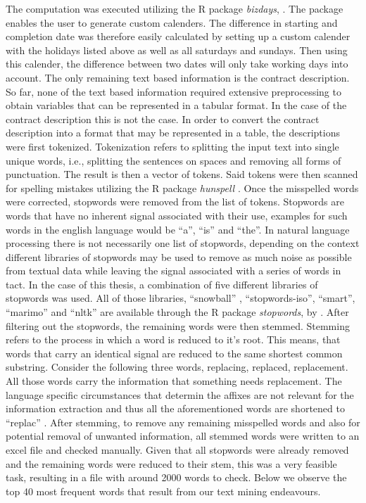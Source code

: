 \documentclass[a4paper,12pt, headsepline]{scrartcl}
\numberwithin{equation}{section}
\begin{document}
 The computation was executed utilizing the R package \textit{bizdays}, \citet{bizdays}. The package enables the user to generate custom calenders. The difference in starting and completion date was therefore easily calculated by setting up a custom calender with the holidays listed above as well as all saturdays and sundays. Then using this calender, the difference between two dates will only take working days into account.
 The only remaining text based information is the contract description. So far, none of the text based information required extensive preprocessing to obtain variables that can be represented in a tabular format. In the case of the contract description this is not the case. In order to convert the contract description into a format that may be represented in a table, the descriptions were first tokenized. Tokenization refers to splitting the input text into single unique words, i.e., splitting the sentences on spaces and removing all forms of punctuation. The result is then a vector of tokens. Said tokens were then scanned for spelling mistakes utilizing the R package \textit{hunspell} \citep{hunspell}. Once the misspelled words were corrected, stopwords were removed from the list of tokens. Stopwords are words that have no inherent signal associated with their use, examples for such words in the english language would be \enquote{a}, \enquote{is} and \enquote{the}. In natural language processing there is not necessarily one list of stopwords, depending on the context different libraries of stopwords may be used to remove as much noise as possible from textual data while leaving the signal associated with a series of words in tact. In the case of this thesis, a combination of five different libraries of stopwords was used. All of those libraries, \enquote{snowball} , \enquote{stopwords-iso}, 
 \enquote{smart}, \enquote{marimo} and \enquote{nltk} are available through the R package \textit{stopwords}, by \citet{stopwords}. After filtering out the stopwords, the remaining words were then stemmed. Stemming refers to the process in which a word is reduced to it's root. This means, that words that carry an identical signal are reduced to the same shortest common substring. Consider the following three words, replacing, replaced, replacement. All those words carry the information that something needs replacement. The language specific circumstances that determin the affixes are not relevant for the information extraction and thus all the aforementioned words are shortened to \enquote{replac} \citet{textminingR}. After stemming, to remove any remaining misspelled words and also for potential removal of unwanted information, all stemmed words were written to an excel file and checked manually. Given that all stopwords were already removed and the remaining words were reduced to their stem, this was a very feasible task, resulting in a file with around 2000 words to check. Below we observe the top 40 most frequent words that result from our text mining endeavours.
 
\end{document}
